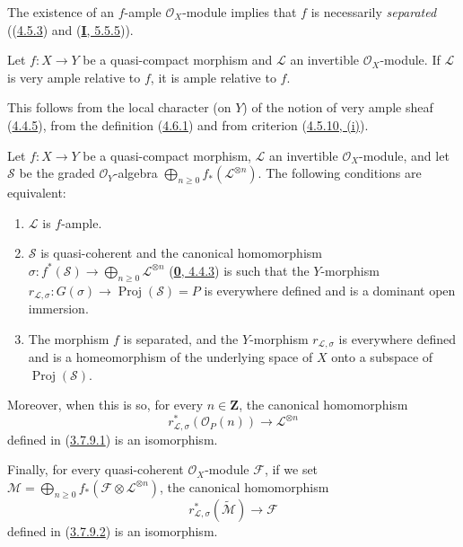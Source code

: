 The existence of an $f$-ample $\mathcal{O}_X$-module implies that $f$ is
necessarily \emph{separated} ((\hyperref[II.4.5.3]{4.5.3}) and
(\hyperref[I.5.5.5]{\textbf{I}, 5.5.5})).

\begin{proposition}[4.6.2]
\label{II.4.6.2}
Let $f:X\to Y$ be a quasi-compact morphism and $\mathcal{L}$ an invertible
$\mathcal{O}_X$-module. If $\mathcal{L}$ is very ample
relative to $f$, it is ample relative to $f$.
\end{proposition}

This follows from the local character (on $Y$) of the notion of very
ample sheaf (\hyperref[II.4.4.5]{4.4.5}), from the definition
(\hyperref[II.4.6.1]{4.6.1}) and from criterion
(\hyperref[II.4.5.10]{4.5.10, (i)}).

\begin{proposition}[4.6.3]
\label{II.4.6.3}
Let $f:X\to Y$ be a quasi-compact morphism, $\mathcal{L}$ an invertible
$\mathcal{O}_X$-module, and let $\mathcal{S}$ be the graded
$\mathcal{O}_Y$-algebra
$\bigoplus_{n\geq0}f_*(\mathcal{L}^{\otimes n})$. The following conditions
are equivalent:
\begin{enumerate}
  \item[\rm{a)}] $\mathcal{L}$ is $f$-ample.
  \item[\rm{b)}] $\mathcal{S}$ is quasi-coherent and the canonical
  homomorphism $\sigma:f^*(\mathcal{S})\to
  \bigoplus_{n\geq0}\mathcal{L}^{\otimes n}$
  \textup{(\hyperref[0.4.4.3]{\textbf{0}, 4.4.3})} is such that the $Y$-morphism
  $r_{\mathcal{L},\sigma}:G(\sigma)\to\operatorname{Proj}(\mathcal{S})=P$
  is everywhere defined and is a dominant open immersion.
  \item[\rm{b')}] The morphism $f$ is separated, and the $Y$-morphism
  $r_{\mathcal{L},\sigma}$ is everywhere defined and is a homeomorphism of
  the underlying space of $X$ onto a subspace of
  $\operatorname{Proj}(\mathcal{S})$.
\end{enumerate}
Moreover, when this is so, for every $n\in\mathbf{Z}$,
the canonical homomorphism
\begin{equation}
\label{II.4.6.3.1}
  r_{\mathcal{L},\sigma}^*(\mathcal{O}_P(n))
  \longrightarrow\mathcal{L}^{\otimes n}
\tag{4.6.3.1}
\end{equation}
defined in \textup{(\hyperref[II.3.7.9.1]{3.7.9.1})} is an isomorphism.

Finally, for every quasi-coherent $\mathcal{O}_X$-module $\mathcal{F}$, if
we set
$\mathcal{M}=\bigoplus_{n\geq0}f_*(\mathcal{F}\otimes
\mathcal{L}^{\otimes n})$, the canonical homomorphism
\begin{equation}
\label{II.4.6.3.2}
  r_{\mathcal{L},\sigma}^*(\widetilde{\mathcal{M}})
  \longrightarrow\mathcal{F}
\tag{4.6.3.2}
\end{equation}
defined in \textup{(\hyperref[II.3.7.9.2]{3.7.9.2})} is an isomorphism.
\end{proposition}


